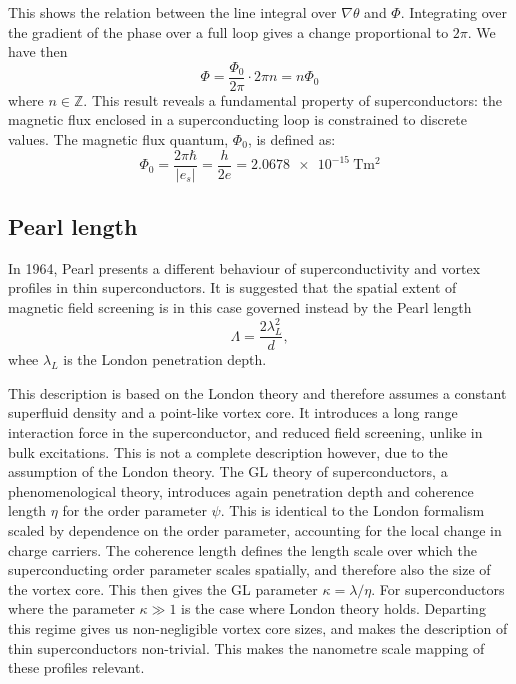 This shows the relation between the line integral over $\nabla \theta$ and $\Phi$. Integrating over the gradient of the phase over a full loop gives a change proportional to $2\pi$. We have then
\begin{equation}
    \Phi = \frac{\Phi_0}{2\pi} \cdot 2\pi n = n\Phi_0
\end{equation}
where $n \in \mathbb{Z}$. This result reveals a fundamental property of superconductors: the magnetic flux enclosed in a superconducting loop is constrained to discrete values. The magnetic flux quantum, $\Phi_0$, is defined as:
\begin{equation}
    \Phi_0 = \frac{2\pi\hbar}{|e_s|} = \frac{h}{2e} = \qty{2.0678e-15}{\tesla\meter^2}
\end{equation}
\subsection*{Pearl length}
In 1964, Pearl\cite{pearlCURRENTDISTRIBUTIONSUPERCONDUCTING1964} presents a different behaviour of superconductivity and vortex profiles in thin superconductors. It is suggested that the spatial extent of magnetic field screening is in this case governed instead by the Pearl length 
\begin{equation}
    \Lambda = \frac{2\lambda_L^2}{d}, 
\end{equation}
whee $\lambda_L$ is the London penetration depth.

This description is based on the London theory and therefore assumes a constant superfluid density and a point-like vortex core. It introduces a long range interaction force in the superconductor, and reduced field screening, unlike in bulk excitations\cite{pearlCURRENTDISTRIBUTIONSUPERCONDUCTING1964}. This is not a complete description however, due to the assumption of the London theory. The \gls{GL} theory of superconductors, a phenomenological theory, introduces again penetration depth and coherence length $\eta$ for the order parameter $\psi$. This is identical to the London formalism scaled by dependence on the order parameter, accounting for the local change in charge carriers. The coherence length defines the length scale over which the superconducting order parameter scales spatially, and therefore also the size of the vortex core. This then gives the \gls{GL} parameter $\kappa=\lambda/\eta$. For superconductors where the parameter $\kappa\gg1$ is the case where London theory holds\cite{balzliRealisticPearlVortices2026}. Departing this regime gives us non-negligible vortex core sizes, and makes the description of thin superconductors non-trivial. This makes the nanometre scale mapping of these profiles relevant.

